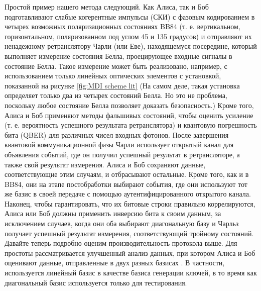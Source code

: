 \newline Простой пример нашего метода следующий. Как Алиса, так и Боб подготавливают слабые когерентные импульсы (СКИ) с фазовым кодированием в четырех возможных поляризационных состояниях BB84 (т. е. вертикальном, горизонтальном, поляризованном под углом 45 и 135 градусов) \cite{bennett1984} и отправляют их ненадежному ретранслятору Чарли (или Еве), находящемуся посередине, который выполняет измерение состояния Белла, проецирующее входные сигналы в состояние Белла. Такое измерение может быть реализовано, например, с использованием только линейных оптических элементов с установкой, показанной на рисунке \ref{fig:MDI scheme lit} (На самом деле, такая установка определяет только два из четырех состояний Белла. Но это не проблема, поскольку любое состояние Белла позволяет доказать безопасность.) Кроме того, Алиса и Боб применяют методы фальшивых состояний, чтобы оценить усиление (т. е. вероятность успешного результата ретранслятора) и квантовую погрешность бита (QBER) для различных чисел входных фотонов. После завершения квантовой коммуникационной фазы Чарли использует открытый канал для объявления событий, где он получил успешный результат в ретрансляторе, а также свой результат измерения. Алиса и Боб сохраняют данные, соответствующие этим случаям, и отбрасывают остальные. Кроме того, как и в BB84, они на этапе постобработки выбирают события, где они используют тот же базис в своей передаче с помощью аутентифицированного открытого канала. Наконец, чтобы гарантировать, что их битовые строки правильно коррелируются, Алиса или Боб должны применить инверсию бита к своим данным, за исключением случаев, когда они оба выбирают диагональную базу и Чарльз получает успешный результат измерения, соответствующий тройному состояний. Давайте теперь подробно оценим производительность протокола выше. Для простоты рассматривается улучшенный анализ данных, при котором Алиса и Боб оценивают данные, отправленные в двух разных базисах \cite{lo2005}. В частности, используется линейный базис в качестве базиса генерации ключей, в то время как диагональный базис используется только для тестирования.
